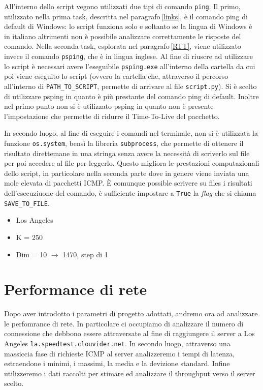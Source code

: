 All'interno dello script vegono utilizzati due tipi di comando \texttt{ping}. Il primo, utilizzato nella prima task, descritta nel paragrafo\,\ref{links}, è il comando ping di default di Windows: lo script funziona solo e soltanto se la lingua di Windows è in italiano altrimenti non è possibile analizzare correttamente le risposte del comando. Nella seconda task, esplorata nel paragrafo\,\ref{RTT}, viene utilizzato invece il comando \texttt{psping}, che è in lingua inglese. Al fine di riuscre ad utilizzare lo script è necessari avere l'eseguibile \texttt{psping.exe} all'interno della cartella da cui poi viene eseguito lo script (ovvero la cartella che, attraverso il percorso all'interno di \texttt{PATH\_TO\_SCRIPT}, permette di arrivare al file \texttt{script.py}). Si è scelto di utilizzare psping in quanto è più prestante del comando ping di default. Inoltre nel primo punto non si è utilizzato psping in quanto non è presente l'impostazione che permette di ridurre il Time-To-Live del pacchetto.

In secondo luogo, al fine di eseguire i comandi nel terminale, non si è utilizzata la funzione \texttt{os.system}, bensì la libreria \texttt{subprocess}, 
che permette di ottenere il risultato direttemane in una stringa senza avere la necessità di scriverlo sul file per poi accedere al file per leggerlo. Questo migliora le prestazioni computazionali dello script, in particolare nella seconda parte dove in genere viene inviata una mole elevata di pacchetti ICMP. È comunque possible scrivere su files i risultati dell'esecuziuone del comando, è sufficiente impostare a \texttt{True} la \textsl{flag} che si chiama \texttt{SAVE\_TO\_FILE}.



\begin{itemize}
    \item Los Angeles
    \item K = 250
    \item Dim = 10 $\to$ 1470, step di 1
\end{itemize}


\vspace{35px}\section{Performance di rete}\label{performance}

Dopo aver introdotto i parametri di progetto adottati, andremo ora ad analizzare le perfomrance di rete. In particolare ci occupiamo di analizzare il numero di connessione che debbono essere attraversate al fine di raggiungere il server a Los Angeles \texttt{la.speedtest.clouvider.net}. In secondo luogo, attraverso una massiccia fase di richieste ICMP al server analizzeremo i tempi di latenza, estraendone i minimi, i massimi, la media e la devizione standard. Infine utilizzeremo i dati raccolti per stimare ed analizzare il throughput verso il server scelto.

